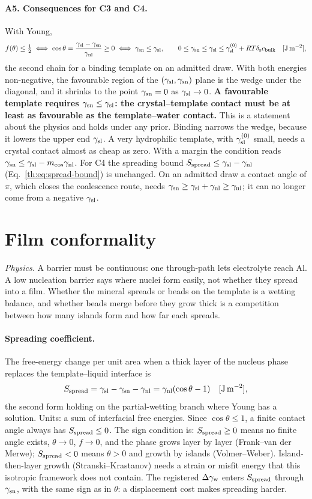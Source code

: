 \paragraph{A5. Consequences for C3 and C4.} With Young,
\begin{equation}\label{th:eq:favourable}
f(\theta)\le\tfrac12\iff\cos\theta=\frac{\gamma_\mathrm{sl}-\gamma_\mathrm{sn}}{\gamma_\mathrm{nl}}\ge0\iff\gamma_\mathrm{sn}\le\gamma_\mathrm{sl},\qquad
0\le\gamma_\mathrm{sn}\le\gamma_\mathrm{sl}\le\gamma_\mathrm{sl}^{(0)}+R T\delta_\mathrm{s}c_\mathrm{bulk} \quad[\mathrm{J\,m^{-2}}],
\end{equation}
the second chain for a binding template on an admitted draw. With both energies non-negative, the
favourable region of the $(\gamma_\mathrm{sl},\gamma_\mathrm{sn})$ plane is the wedge under the diagonal, and it shrinks to the
point $\gamma_\mathrm{sn}=0$ as $\gamma_\mathrm{sl}\to0$. \textbf{A favourable template requires $\gamma_\mathrm{sn}\le\gamma_\mathrm{sl}$: the
crystal--template contact must be at least as favourable as the template--water contact.} This is a
statement about the physics and holds under any prior. Binding narrows the wedge, because it lowers
the upper end $\gamma_\mathrm{sl}$. A very hydrophilic template, with $\gamma_\mathrm{sl}^{(0)}$ small, needs a crystal contact almost as
cheap as zero. With a margin the condition reads $\gamma_\mathrm{sn}\le\gamma_\mathrm{sl}-m_{\cos}\gamma_\mathrm{nl}$. For C4 the spreading bound
$S_\mathrm{spread}\le\gamma_\mathrm{sl}-\gamma_\mathrm{nl}$ (Eq.~\eqref{th:eq:spread-bound}) is unchanged. On an admitted draw a contact angle
of $\pi$, which closes the coalescence route, needs $\gamma_\mathrm{sn}\ge\gamma_\mathrm{sl}+\gamma_\mathrm{nl}\ge\gamma_\mathrm{nl}$; it can no longer come
from a negative $\gamma_\mathrm{sl}$.

\section{Film conformality}\label{th:sec:conformality}

\textit{Physics.} A barrier must be continuous: one through-path lets electrolyte reach Al. A
low nucleation barrier says where nuclei form easily, not whether they spread into a film. Whether
the mineral spreads or beads on the template is a wetting balance, and whether beads merge before
they grow thick is a competition between how many islands form and how far each spreads.

\paragraph{Spreading coefficient.} The free-energy change per unit area when a thick layer of the
nucleus phase replaces the template--liquid interface is
\begin{equation}\label{th:eq:spread}
S_\mathrm{spread}=\gamma_\mathrm{sl}-\gamma_\mathrm{sn}-\gamma_\mathrm{nl}=\gamma_\mathrm{nl}(\cos\theta-1) \quad[\mathrm{J\,m^{-2}}],
\end{equation}
the second form holding on the partial-wetting branch where Young has a solution. Units: a sum of
interfacial free energies. Since $\cos\theta\le1$, a finite contact angle always has $S_\mathrm{spread}\le0$.
The sign condition is:
$S_\mathrm{spread}\ge0$ means no finite angle exists, $\theta\to0$, $f\to0$, and the phase grows layer by
layer (Frank--van der Merwe); $S_\mathrm{spread}<0$ means $\theta>0$ and growth by islands (Volmer--Weber).
Island-then-layer growth (Stranski--Krastanov) needs a strain or misfit energy that this
isotropic framework does not contain. The registered $\Delta\gamma_\mathrm{w}$ enters $S_\mathrm{spread}$ through $\gamma_\mathrm{sn}$, with
the same sign as in $\theta$: a displacement cost makes spreading harder.

